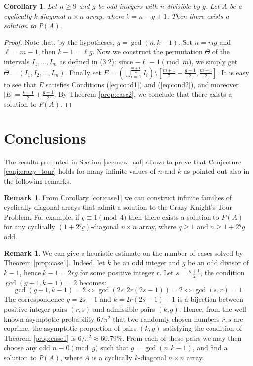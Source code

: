 \documentclass{amsart}
\newtheorem{cor}[prop]{Corollary}
\theoremstyle{definition}
\newtheorem{rem}[prop]{Remark}
\numberwithin{equation}{section}
\begin{document}
\begin{cor} \label{cor:case2}
Let $n\geq9$ and  $g$ be odd integers with $n$ divisible by $g$.
Let $A$ be a cyclically $k$-diagonal  $n \times n$ array, where $k=n-g+1$.
Then there exists a solution to $P(A)$.
\end{cor}
\begin{proof}
Note that, by the hypotheses, $g=\gcd(n,k-1)$.
Set $n = mg$ and $\ell = m-1$, then $k-1=\ell g$.  
Now we construct the permutation $\Theta$ of the intervals $I_1,\dotsc,I_m$ as defined in (3.2): since $-\ell \equiv 1 \pmod{m}$, we simply get $\Theta =(I_1,I_2,\dotsc,I_m)$. 
Finally set $E =( \bigcup_{i=1}^{\frac{m+1}{2}}I_i) \setminus [\frac{m+1}{2}-\frac{g-1}{2}, \frac{m+1}{2}]$. It is easy to see that $E$ satisfies Conditions (\ref{eq:cond1}) and (\ref{eq:cond2}), and moreover $|E| = \frac{k-1}{2} + \frac{g-1}{2}$. By Theorem \ref{prop:case2}, we conclude that there exists a solution to $P(A)$.
\end{proof}

\section{Conclusions}
The results presented in Section \ref{sec:new_sol} allows to prove that Conjecture \ref{conj:crazy_tour} holds for many infinite values of $n$ and $k$ as pointed out also in the following remarks.

\begin{rem} \label{rem:prime_times_2}
   From Corollary \ref{cor:case1} we can construct  infinite families of cyclically diagonal arrays that admit a solution to the Crazy Knight's Tour Problem. For example, if $g \equiv 1 \pmod{4}$ then there exists a solution to $P(A)$ for any cyclically $(1+2^q g)$-diagonal $n\times n$ array, where $q\geq 1 $ and $n \geq 1+2^q g$ odd.
\end{rem}

\begin{rem}
We can give a heuristic estimate on the number of cases solved by Theorem \ref{prop:case1}. Indeed, let $k$ be an odd integer and $g$ be an odd divisor of $k-1$, hence $k-1=2rg$ for some positive integer $r$. Let $s =\frac{g+1}{2}$, the condition $\gcd(g+1,k-1)=2$ becomes:
\[
\gcd(g+1,k-1)=2 \Leftrightarrow \gcd(2s,2r(2s-1))=2 \Leftrightarrow \gcd(s,r)=1.
\]
The correspondence  $g=2s-1$ and $k=2r(2s-1)+1$ is a bijection between positive integer pairs $(r,s)$ and admissible pairs $(k,g)$. Hence, from the well known  asymptotic probability $6/\pi^2$ that two randomly chosen numbers $r,s$  are coprime, the asymptotic proportion of pairs $(k,g)$ satisfying the condition of Theorem \ref{prop:case1} is $6/\pi^2\approx 60.79\%$. From each of these pairs we may then
choose any odd $n\equiv 0 \pmod{g}$ such that $g = \gcd(n,k-1)$, and find a solution to $P(A)$, where $A$ is a cyclically $k$-diagonal $n\times n$ array.
\end{rem}
\end{document}
